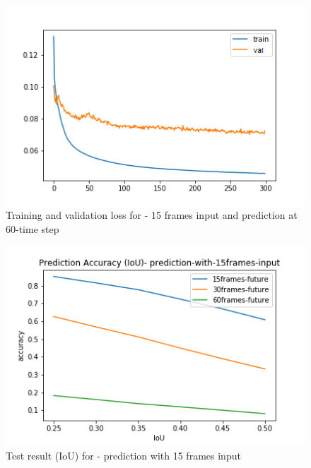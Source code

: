\begin{figure}[H] 
\includegraphics[scale=0.8]{conf9_300e_60ffuture}
\begin{center}
\caption{Training and validation loss for - 15 frames input and prediction at 60-time step }
\label{15-60}
\end{center}
\end{figure}

\begin{figure}[H] 
\includegraphics[scale=0.8]{prediction-with-15frames-input_IoU}
\begin{center}
\caption{Test result (IoU) for - prediction with 15 frames input}
\label{15-IoU}
\end{center}
\end{figure}

